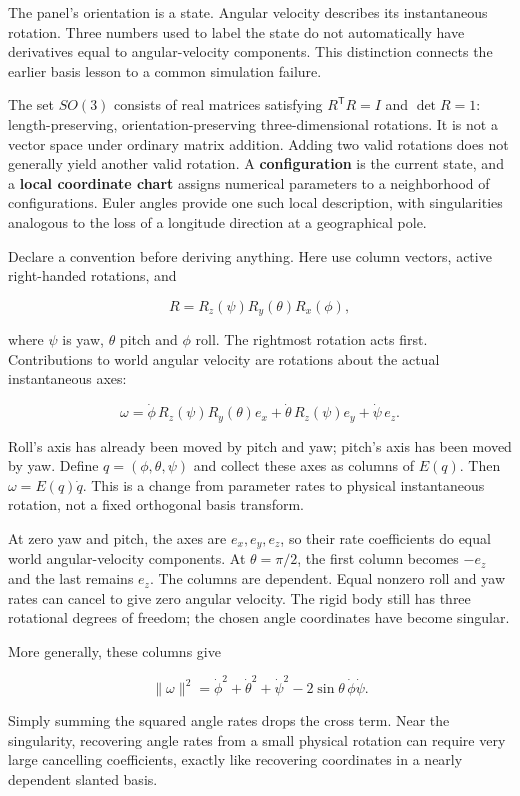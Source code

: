 The panel's orientation is a state. Angular velocity describes its instantaneous rotation. Three numbers used to label the state do not automatically have derivatives equal to angular-velocity components. This distinction connects the earlier basis lesson to a common simulation failure.

The set \(SO(3)\) consists of real matrices satisfying \(R^{\mathsf T}R=I\) and \(\det R=1\): length-preserving, orientation-preserving three-dimensional rotations. It is not a vector space under ordinary matrix addition. Adding two valid rotations does not generally yield another valid rotation. A \textbf{configuration} is the current state, and a \textbf{local coordinate chart} assigns numerical parameters to a neighborhood of configurations. Euler angles provide one such local description, with singularities analogous to the loss of a longitude direction at a geographical pole.

Declare a convention before deriving anything. Here use column vectors, active right-handed rotations, and

\[
R=R_z(\psi)R_y(\theta)R_x(\phi),
\]

where \(\psi\) is yaw, \(\theta\) pitch and \(\phi\) roll. The rightmost rotation acts first. Contributions to world angular velocity are rotations about the actual instantaneous axes:

\[
\omega=
\dot\phi\,R_z(\psi)R_y(\theta)e_x
+\dot\theta\,R_z(\psi)e_y
+\dot\psi\,e_z.
\]

Roll's axis has already been moved by pitch and yaw; pitch's axis has been moved by yaw. Define \(q=(\phi,\theta,\psi)\) and collect these axes as columns of \(E(q)\). Then \(\omega=E(q)\dot q\). This is a change from parameter rates to physical instantaneous rotation, not a fixed orthogonal basis transform.

At zero yaw and pitch, the axes are \(e_x,e_y,e_z\), so their rate coefficients do equal world angular-velocity components. At \(\theta=\pi/2\), the first column becomes \(-e_z\) and the last remains \(e_z\). The columns are dependent. Equal nonzero roll and yaw rates can cancel to give zero angular velocity. The rigid body still has three rotational degrees of freedom; the chosen angle coordinates have become singular.

More generally, these columns give

\[
\|\omega\|^2=
\dot\phi^2+\dot\theta^2+\dot\psi^2
-2\sin\theta\,\dot\phi\dot\psi.
\]

Simply summing the squared angle rates drops the cross term. Near the singularity, recovering angle rates from a small physical rotation can require very large cancelling coefficients, exactly like recovering coordinates in a nearly dependent slanted basis.

